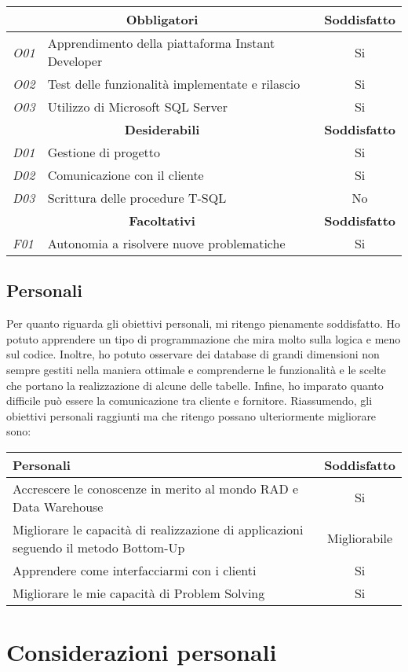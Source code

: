 \begin{center}
	\begin{tabular}{ l|l|c }
		\hline
		
		\multicolumn{2}{c}{\textbf{Obbligatori}} & \textbf{Soddisfatto} \\
		\hline
		\textit{O01} & Apprendimento della piattaforma Instant Developer & Si\\
		\textit{O02} & Test delle funzionalità implementate e rilascio & Si\\
		\textit{O03} & Utilizzo di Microsoft SQL Server& Si\\
		\hline
		\multicolumn{2}{c}{\textbf{Desiderabili}} & \textbf{Soddisfatto}\\
		\hline
		\textit{D01} & Gestione di progetto & Si\\
		\textit{D02} & Comunicazione con il cliente & Si\\
		\textit{D03} & Scrittura delle procedure T-SQL& No\\
		\hline
		\multicolumn{2}{c}{\textbf{Facoltativi}} & \textbf{Soddisfatto}\\
		\hline
		\textit{F01} & Autonomia a risolvere nuove problematiche & Si
		
	\end{tabular}
\end{center}
	

\subsection{Personali}
Per quanto riguarda gli obiettivi personali, mi ritengo pienamente soddisfatto. Ho potuto apprendere un tipo di programmazione che mira molto sulla logica e meno sul codice. Inoltre, ho potuto osservare dei database di grandi dimensioni non sempre gestiti nella maniera ottimale e comprenderne le funzionalità e le scelte che portano la realizzazione di alcune delle tabelle. Infine, ho imparato quanto difficile può essere la comunicazione tra cliente e fornitore.
Riassumendo, gli obiettivi personali raggiunti ma che ritengo possano ulteriormente migliorare sono:


\begin{center}
	\begin{tabular}{p{10cm}|c}
		\hline
		\textbf{Personali}& \textbf{Soddisfatto} \\
		\hline
		Accrescere le conoscenze in merito al mondo RAD e Data Warehouse & Si\\
		Migliorare le capacità di realizzazione di applicazioni seguendo il metodo Bottom-Up & Migliorabile\\
		Apprendere come interfacciarmi con i clienti & Si\\
		Migliorare le mie capacità di Problem Solving & Si

	\end{tabular}
\end{center}


\section{Considerazioni personali}
